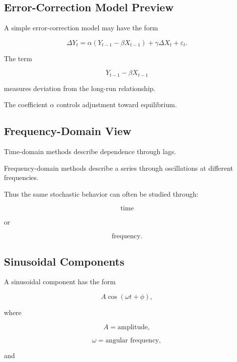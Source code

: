 \subsection{Error-Correction Model Preview}
\label{subsec:error-correction-model}

A simple error-correction model may have the form

\[
\boxed{
\Delta Y_t
=
\alpha
(
Y_{t-1}
-
\beta X_{t-1}
)
+
\gamma
\Delta X_t
+
\varepsilon_t.
}
\]

The term

\[
Y_{t-1}-\beta X_{t-1}
\]

measures deviation from the long-run relationship.

The coefficient \(\alpha\) controls adjustment toward equilibrium.

\subsection{Frequency-Domain View}
\label{subsec:frequency-domain-view}

Time-domain methods describe dependence through lags.

Frequency-domain methods describe a series through oscillations at
different frequencies.

Thus the same stochastic behavior can often be studied through:

\[
\boxed{
\text{time}
}
\]

or

\[
\boxed{
\text{frequency}.
}
\]

\subsection{Sinusoidal Components}
\label{subsec:sinusoidal-components}

A sinusoidal component has the form

\[
\boxed{
A
\cos
(
\omega t+\phi
),
}
\]

where

\[
A
=
\text{amplitude},
\]

\[
\omega
=
\text{angular frequency},
\]

and

